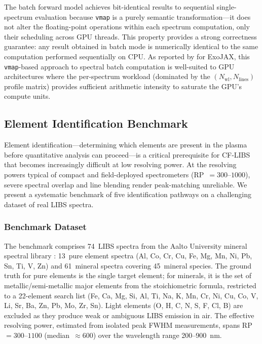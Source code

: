 The batch forward model achieves bit-identical results to sequential single-spectrum evaluation because \texttt{vmap} is a purely semantic transformation---it does not alter the floating-point operations within each spectrum computation, only their scheduling across GPU threads.
This property provides a strong correctness guarantee: any result obtained in batch mode is numerically identical to the same computation performed sequentially on CPU.
As reported by \citet{Kawahara2022} for ExoJAX, this \texttt{vmap}-based approach to spectral batch computation is well-suited to GPU architectures where the per-spectrum workload (dominated by the $(N_\mathrm{wl},\allowbreak N_\mathrm{lines})$ profile matrix) provides sufficient arithmetic intensity to saturate the GPU's compute units.

\subsection{Element Identification Benchmark}
\label{sec:element-id}

Element identification---determining which elements are present in the plasma before quantitative analysis can proceed---is a critical prerequisite for CF-LIBS that becomes increasingly difficult at low resolving power.
At the resolving powers typical of compact and field-deployed spectrometers (RP~$= 300$--$1000$), severe spectral overlap and line blending render peak-matching unreliable.
We present a systematic benchmark of five identification pathways on a challenging dataset of real LIBS spectra.

\subsubsection{Benchmark Dataset}

The benchmark comprises 74~LIBS spectra from the Aalto University mineral spectral library \citep{Drozdovskiy2020}: 13~pure element spectra (Al, Co, Cr, Cu, Fe, Mg, Mn, Ni, Pb, Sn, Ti, V, Zn) and 61~mineral spectra covering 45~mineral species.
The ground truth for pure elements is the single target element; for minerals, it is the set of metallic/semi-metallic major elements from the stoichiometric formula, restricted to a 22-element search list (Fe, Ca, Mg, Si, Al, Ti, Na, K, Mn, Cr, Ni, Cu, Co, V, Li, Sr, Ba, Zn, Pb, Mo, Zr, Sn).
Light elements (O, H, C, N, S, F, Cl, B) are excluded as they produce weak or ambiguous LIBS emission in air.
The effective resolving power, estimated from isolated peak FWHM measurements, spans RP~$= 300$--$1100$ (median~$\approx 600$) over the wavelength range 200--900~nm.

